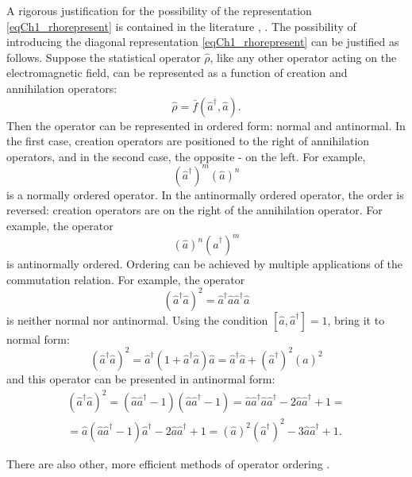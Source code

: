 A rigorous justification for the possibility of the representation \eqref{eqCh1_rhorepresent} is contained in the literature \cite{bQuantumOpticsAndRadioPhisicsLecture1966}, \cite{bKaluderSudershan1970}. 
The possibility of introducing the diagonal representation \eqref{eqCh1_rhorepresent} can be justified as follows. Suppose the statistical operator $\hat{\rho}$, like any other operator acting on the electromagnetic field, can be represented as a function of creation and annihilation operators:
\[
\hat{\rho} = \bar{f}\left(\hat{a}^{\dag}, \hat{a}\right).
\]
Then the operator can be represented in ordered form: normal and antinormal. In the first case, creation operators are positioned to the right of annihilation operators, and in the second case, the opposite - on the left.
For example,
\[
\left(\hat{a}^{\dag}\right)^m\left(\hat{a}\right)^n
\]
is a normally ordered operator. In the antinormally ordered operator, the order is reversed: creation operators are on the right of the annihilation operator. For example, the operator 
\[
\left(\hat{a}\right)^n\left(\hat{a}^{\dag}\right)^m
\]
is antinormally ordered. Ordering can be achieved by multiple applications of the commutation relation. For example, the operator  
\[
\left(\hat{a}^{\dag}\hat{a}\right)^2 =
\hat{a}^{\dag}\hat{a}\hat{a}^{\dag}\hat{a} 
\]
is neither normal nor antinormal. Using the condition 
$\left[\hat{a},\hat{a}^{\dag}\right] = 1$,
bring it to normal form: 
\[
\left(\hat{a}^{\dag}\hat{a}\right)^2 = \hat{a}^{\dag}\left(1 +
\hat{a}^{\dag}\hat{a}\right)\hat{a} = 
\hat{a}^{\dag}\hat{a} + \left(\hat{a}^{\dag}\right)^2\left(\hat{a}\right)^2
\]
and this operator can be presented in antinormal form:
\begin{eqnarray}
\left(\hat{a}^{\dag}\hat{a}\right)^2 = 
\left(\hat{a}\hat{a}^{\dag} - 1\right) \left(\hat{a}\hat{a}^{\dag} -
1\right) = \hat{a}\hat{a}^{\dag} \hat{a}\hat{a}^{\dag} - 2
\hat{a}\hat{a}^{\dag} + 1 =
\nonumber \\
= \hat{a}\left(\hat{a}\hat{a}^{\dag} - 1\right)\hat{a}^{\dag} -
2\hat{a}\hat{a}^{\dag} + 1 = 
\left(\hat{a}\right)^2\left(\hat{a}^{\dag}\right)^2 - 3
\hat{a}\hat{a}^{\dag} + 1.
\nonumber
\end{eqnarray}

There are also other, more efficient methods of operator ordering \cite{bLuisell1972}.

